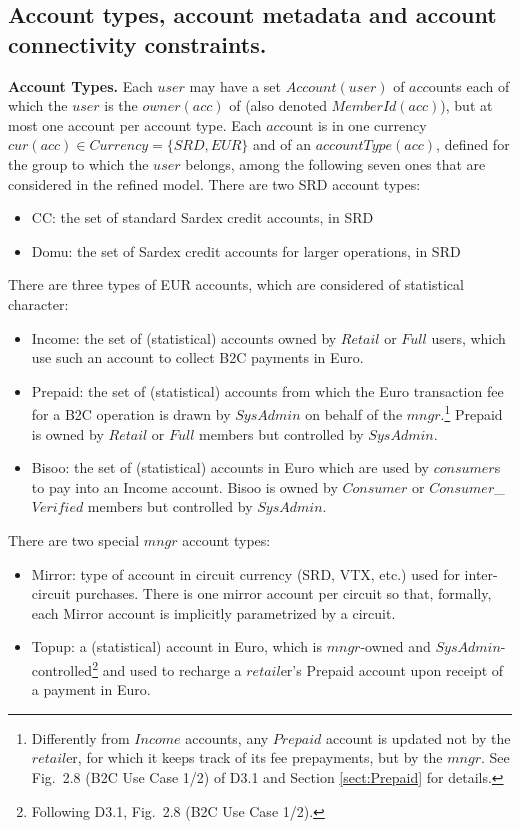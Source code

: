 \subsection{Account types, account metadata and account connectivity constraints.}
\label{sect:accounts}

{\bf Account Types.} Each $user$ may have a set $Account(user)$ of $acc$ounts each of which the $user$ is the  $owner(acc)$ of (also denoted $MemberId(acc)$), but at most one account per account type. Each $acc$ount is in one currency $cur(acc) \in Currency=\{SRD,EUR\}$ and of an $accountType(acc)$, defined for the group to which the $user$ belongs, among the following seven ones that are considered in the refined model. There are two SRD account types:
\begin{itemize}
	\item CC: the set of standard Sardex credit accounts, in SRD
	\item Domu:  the set of Sardex credit accounts for larger operations, in SRD
\end{itemize}

There are three types of EUR accounts, which are considered of statistical character:
\begin{itemize}
	\item  Income: the set of (statistical) accounts owned by $Retail$ or $Full$ users, which use such an account to collect B2C payments in Euro.
	
	\item Prepaid: the set of (statistical) accounts from which the Euro transaction fee for a B2C operation is drawn by $SysAdmin$ on behalf of the $mngr$.\footnote{Differently from $Income$ accounts, any $Prepaid$ account is updated not by the $retail$er, for which it keeps track of its fee prepayments, but by the $mngr$. See Fig.\ 2.8 (B2C Use Case 1/2) of D3.1 and Section \ref{sect:Prepaid} for details.} 
	Prepaid is owned by $Retail$ or $Full$ members but controlled by $SysAdmin$.
	
	\item Bisoo: the set of (statistical) accounts in Euro which are used by $consumer$s to pay into an Income account. Bisoo is owned by $Consumer$ or $Consumer$\_$Verified$ members but controlled by $SysAdmin$.
\end{itemize}

There are two special $mngr$ account types:
\begin{itemize}
	\item Mirror: type of account in circuit currency (SRD, VTX, etc.) used for inter-circuit purchases. There is one mirror account per circuit so that, formally, each Mirror account is implicitly parametrized by a circuit.	
	\item Topup: a (statistical) account in Euro, which is $mngr$-owned and $SysAdmin$-controlled\footnote{Following D3.1, Fig.\ 2.8 (B2C Use Case 1/2).}  and used to recharge a $retail$er's Prepaid account upon receipt of a payment in Euro.
\end{itemize}

